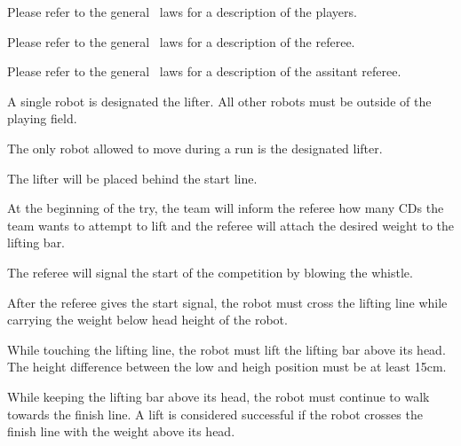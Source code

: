 \documentclass[12pt]{hurocup}
\begin{document}

Please refer to the general \HuroCup\ laws for a description of
the players.


Please refer to the general \HuroCup\ laws for a description of
the referee.


Please refer to the general \HuroCup\ laws for a description of
the assitant referee.


\begin{lawlist}[WL]

\item A single robot is designated the lifter. All other robots
  must be outside of the playing field.

\item The only robot allowed to move during a run is the
  designated lifter.

\item The lifter will be placed behind the start line.

\item At the beginning of the try, the team will inform the
 referee how many CDs the team wants to attempt to lift and the
 referee will attach the desired weight to the lifting bar.

\item The referee will signal the start of the competition by blowing
  the whistle.

\item After the referee gives the start signal, the robot must cross
 the lifting line while carrying the weight below head height of the
 robot.

\item While touching the lifting line, the robot must lift the lifting
 bar above its head. The height difference between the low and heigh
 position must be at least 15cm.

\item While keeping the lifting bar above its head, the robot must
 continue to walk towards the finish line. A lift is considered
 successful if the robot crosses the finish line with the weight above
 its head.


\end{lawlist}
\end{document}
